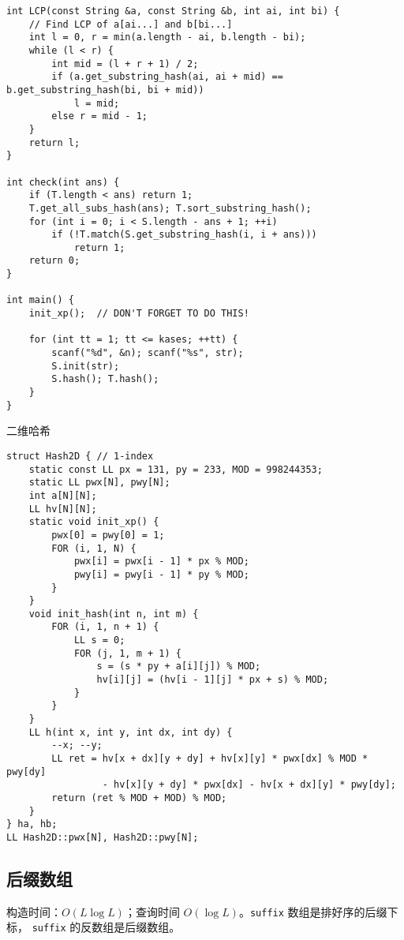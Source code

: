 \documentclass[]{article}
\begin{document}
\begin{verbatim}
int LCP(const String &a, const String &b, int ai, int bi) {
    // Find LCP of a[ai...] and b[bi...]
    int l = 0, r = min(a.length - ai, b.length - bi);
    while (l < r) {
        int mid = (l + r + 1) / 2;
        if (a.get_substring_hash(ai, ai + mid) == b.get_substring_hash(bi, bi + mid))
            l = mid;
        else r = mid - 1;
    }
    return l;
}

int check(int ans) {
    if (T.length < ans) return 1;
    T.get_all_subs_hash(ans); T.sort_substring_hash();
    for (int i = 0; i < S.length - ans + 1; ++i)
        if (!T.match(S.get_substring_hash(i, i + ans)))
            return 1;
    return 0;
}

int main() {
    init_xp();  // DON'T FORGET TO DO THIS!

    for (int tt = 1; tt <= kases; ++tt) {
        scanf("%d", &n); scanf("%s", str);
        S.init(str);
        S.hash(); T.hash();
    }
}
\end{verbatim}

二维哈希

\begin{verbatim}
struct Hash2D { // 1-index
    static const LL px = 131, py = 233, MOD = 998244353;
    static LL pwx[N], pwy[N];
    int a[N][N];
    LL hv[N][N];
    static void init_xp() {
        pwx[0] = pwy[0] = 1;
        FOR (i, 1, N) {
            pwx[i] = pwx[i - 1] * px % MOD;
            pwy[i] = pwy[i - 1] * py % MOD;
        }
    }
    void init_hash(int n, int m) {
        FOR (i, 1, n + 1) {
            LL s = 0;
            FOR (j, 1, m + 1) {
                s = (s * py + a[i][j]) % MOD;
                hv[i][j] = (hv[i - 1][j] * px + s) % MOD;
            }
        }
    }
    LL h(int x, int y, int dx, int dy) {
        --x; --y;
        LL ret = hv[x + dx][y + dy] + hv[x][y] * pwx[dx] % MOD * pwy[dy]
                 - hv[x][y + dy] * pwx[dx] - hv[x + dx][y] * pwy[dy];
        return (ret % MOD + MOD) % MOD;
    }
} ha, hb;
LL Hash2D::pwx[N], Hash2D::pwy[N];
\end{verbatim}

\hypertarget{ux540eux7f00ux6570ux7ec4}{%
\subsection{后缀数组}\label{ux540eux7f00ux6570ux7ec4}}

构造时间：\(O(L \log L)\)；查询时间 \(O(\log L)\)。\texttt{suffix}
数组是排好序的后缀下标， \texttt{suffix} 的反数组是后缀数组。
\end{document}

